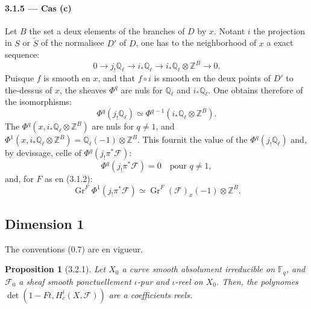 \documentclass[12pt,a4paper]{article}
\theoremstyle{plain}
\newtheorem{proposition}[theorem]{Proposition}
\theoremstyle{definition}
\theoremstyle{remark}
\DeclareMathOperator{\Gr}{Gr}
\newcommand{\FF}{{\mathbb{F}}}
\newcommand{\QQ}{{\mathbb{Q}}}
\newcommand{\ZZ}{{\mathbb{Z}}}
\begin{document}
\paragraph{3.1.5 --- Cas (c)}
Let $B$ the set a deux elements of the branches of $D$ by $x$. Notant $i$ the projection in $S$ or $\widetilde{S}$ of the normalisee $D'$ of $D$, one has to the neighborhood of $x$ a exact sequence:
\begin{equation}\label{eq:3.1.5.1}
0 \to j_! \QQ_\ell \to i_* \QQ_\ell \to i_* \QQ_\ell \otimes \ZZ^B \to 0.
\end{equation}
Puisque $f$ is smooth en $x$, and that $f \circ i$ is smooth en the deux points of $D'$ to the-dessus of $x$, the sheaves $\Phi^q$ are nuls for $\QQ_\ell$ and $i_* \QQ_\ell$. One obtains therefore of the isomorphisms:
\begin{equation}\label{eq:3.1.5.2}
\Phi^q(j_! \QQ_\ell) \simeq \Phi^{q-1}(i_* \QQ_\ell \otimes \ZZ^B).
\end{equation}
The $\Phi^q(x, i_* \QQ_\ell \otimes \ZZ^B)$ are nuls for $q \neq 1$, and $\Phi^1(x, i_* \QQ_\ell \otimes \ZZ^B) = \QQ_\ell(-1) \otimes \ZZ^B$. This fournit the value of the $\Phi^q(j_! \QQ_\ell)$ and, by devissage, celle of $\Phi^q(j_! \pi^*\mathscr{F})$:
\begin{equation}\label{eq:3.1.5.3}
\Phi^q(j_! \pi^*\mathscr{F}) = 0 \quad \text{pour } q \neq 1,
\end{equation}
and, for $F$ as en (3.1.2):
\begin{equation}\label{eq:3.1.5.4}
\Gr^F \Phi^1(j_! \pi^*\mathscr{F}) \simeq \Gr^F(\mathscr{F})_x(-1) \otimes \ZZ^B.
\end{equation}


\subsection{Dimension 1}

The conventions (0.7) are en vigueur.

\begin{proposition}[3.2.1]
Let $X_0$ a curve smooth absolument irreducible on $\FF_q$, and $\mathscr{F}_0$ a sheaf smooth ponctuellement $\iota$-pur and $\iota$-reel on $X_0$. Then, the polynomes $\det(1 - Ft, H_c^i(X, \mathscr{F}))$ are a coefficients reels.
\end{proposition}
\end{document}
